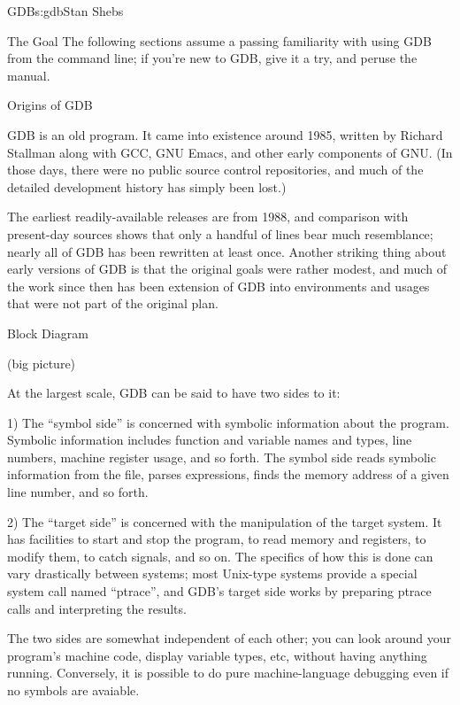 \begin{aosachapter}{GDB}{s:gdb}{Stan Shebs}
\begin{aosasect1}{The Goal}
The following sections assume a passing familiarity with using GDB
from the command line; if you're new to GDB, give it a try, and peruse
the manual.

\begin{aosasect1}{Origins of GDB}

GDB is an old program.  It came into existence around 1985, written
by Richard Stallman along with GCC, GNU Emacs, and other early
components of GNU.  (In those days, there were no public source
control repositories, and much of the detailed development history
has simply been lost.)

The earliest readily-available releases are from 1988, and comparison
with present-day sources shows that only a handful of lines bear much
resemblance; nearly all of GDB has been rewritten at least once.
Another striking thing about early versions of GDB is that the
original goals were rather modest, and much of the work since then has
been extension of GDB into environments and usages that were not part
of the original plan.

\end{aosasect1}

\begin{aosasect1}{Block Diagram}

(big picture)

At the largest scale, GDB can be said to have two sides to it:

1) The ``symbol side'' is concerned with symbolic information about
the program.  Symbolic information includes function and variable
names and types, line numbers, machine register usage, and so forth.
The symbol side reads symbolic information from the file, parses
expressions, finds the memory address of a given line number, and so
forth.

2) The ``target side'' is concerned with the manipulation of the
target system.  It has facilities to start and stop the program, to
read memory and registers, to modify them, to catch signals, and so
on.  The specifics of how this is done can vary drastically between
systems; most Unix-type systems provide a special system call named
``ptrace'', and GDB's target side works by preparing ptrace calls
and interpreting the results.

The two sides are somewhat independent of each other; you can look
around your program's machine code, display variable types, etc,
without having anything running.  Conversely, it is possible to do
pure machine-language debugging even if no symbols are avaiable.


\end{aosasect1}
\end{aosasect1}
\end{aosachapter}

